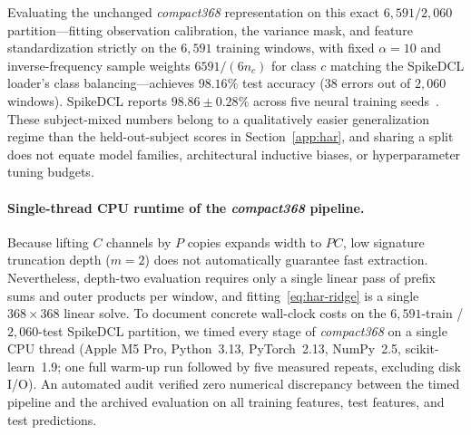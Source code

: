 Evaluating the unchanged \emph{compact368} representation on this exact
\(6{,}591 / 2{,}060\) partition---fitting observation calibration, the variance
mask, and feature standardization strictly on the \(6{,}591\) training windows,
with fixed \(\alpha = 10\) and inverse-frequency sample weights
\(6591 / (6 n_c)\) for class \(c\) matching the SpikeDCL loader's class
balancing---achieves \(98.16\%\) test accuracy (\(38\) errors out of \(2{,}060\)
windows). SpikeDCL reports \(98.86 \pm 0.28\%\) across five neural training
seeds~\cite[Table~2]{spikedcl}. These subject-mixed numbers belong to a
qualitatively easier generalization regime than the held-out-subject scores in
Section~\ref{app:har}, and sharing a split does not equate model families,
architectural inductive biases, or hyperparameter tuning budgets.

\paragraph{Single-thread CPU runtime of the \emph{compact368} pipeline.}
Because lifting \(C\) channels by \(P\) copies expands width to \(PC\), low
signature truncation depth (\(m = 2\)) does not automatically guarantee fast
extraction. Nevertheless, depth-two evaluation requires only a single linear pass
of prefix sums and outer products per window, and fitting~\eqref{eq:har-ridge} is
a single \(368 \times 368\) linear solve. To document concrete wall-clock costs
on the \(6{,}591\)-train / \(2{,}060\)-test SpikeDCL partition, we timed every
stage of \emph{compact368} on a single CPU thread (Apple M5 Pro, Python~3.13,
PyTorch~2.13, NumPy~2.5, scikit-learn~1.9; one full warm-up run followed by five
measured repeats, excluding disk I/O). An automated audit verified zero
numerical discrepancy between the timed pipeline and the archived evaluation on
all training features, test features, and test predictions.

